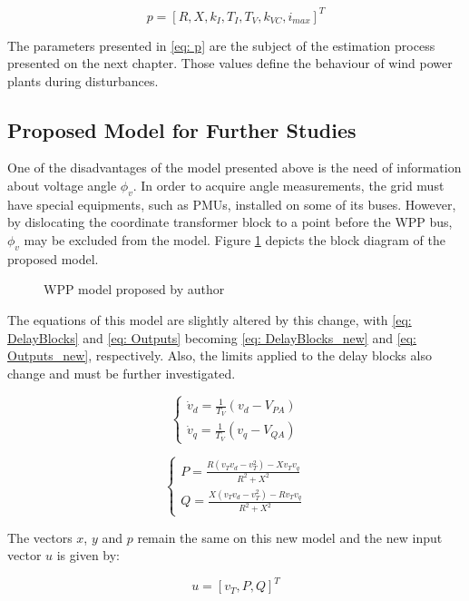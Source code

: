 \begin{equation}
	p = [R, X, k_{I}, T_{I}, T_{V}, k_{VC}, i_{max}]^T
	\label{eq: p}
\end{equation}

The parameters presented in \eqref{eq: p} are the subject of the estimation process presented on the next chapter. Those values define the behaviour of wind power plants during disturbances.

\subsection{Proposed Model for Further Studies}

One of the disadvantages of the model presented above is the need of information about voltage angle $\phi_{v}$. In order to acquire angle measurements, the grid must have special equipments, such as PMUs, installed on some of its buses. However, by dislocating the coordinate transformer block to a point before the WPP bus, $\phi_{v}$ may be excluded from the model. Figure \ref{fig: Proposed_Model} depicts the block diagram of the proposed model.

\begin{figure}[h]
	\caption{WPP model proposed by author}
	\begin{center}
	\end{center}
	\label{fig: Proposed_Model}
\end{figure}

The equations of this model are slightly altered by this change, with \eqref{eq: DelayBlocks} and \eqref{eq: Outputs} becoming \eqref{eq: DelayBlocks_new} and \eqref{eq: Outputs_new}, respectively. Also, the limits applied to the delay blocks also change and must be further investigated.

\begin{equation}
	\begin{cases}
		\dot{v}_{d} = \frac{1}{T_{V}}(v_{d} - V_{PA}) \\
		\dot{v}_{q} = \frac{1}{T_{V}}(v_{q} - V_{QA})
	\end{cases}
	\label{eq: DelayBlocks_new}
\end{equation}

\begin{equation}
	\begin{cases}
		P = \frac{R(v_{T}v_{d} - v_{T}^{2}) - Xv_{T}v_{q}}{R^{2} + X^{2}} \\
		Q = \frac{X(v_{T}v_{d} - v_{T}^{2}) - Rv_{T}v_{q}}{R^{2} + X^{2}}
	\end{cases}
	\label{eq: Outputs_new}
\end{equation}

The vectors $x$, $y$ and $p$ remain the same on this new model and the new input vector $u$ is given by:

\begin{equation}
	u = [v_{T}, P, Q]^T
	\label{eq: u_new}
\end{equation}